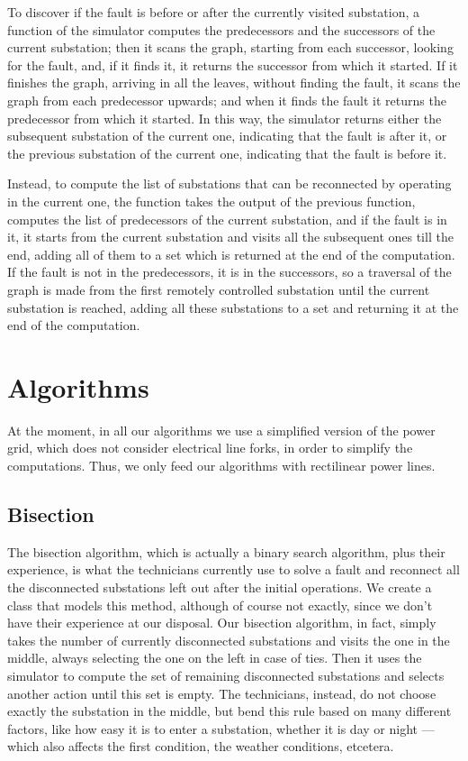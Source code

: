 To discover if the fault is before or after the currently visited substation, a function of the simulator computes the predecessors and the successors of the current substation; then it scans the graph, starting from each successor, looking for the fault, and, if it finds it, it returns the successor from which it started. If it finishes the graph, arriving in all the leaves, without finding the fault, it scans the graph from each predecessor upwards; and when it finds the fault it returns the predecessor from which it started. In this way, the simulator returns either the subsequent substation of the current one, indicating that the fault is after it, or the previous substation of the current one, indicating that the fault is before it.

Instead, to compute the list of substations that can be reconnected by operating in the current one, the function takes the output of the previous function, computes the list of predecessors of the current substation, and if the fault is in it, it starts from the current substation and visits all the subsequent ones till the end, adding all of them to a set which is returned at the end of the computation. If the fault is not in the predecessors, it is in the successors, so a traversal of the graph is made from the first remotely controlled substation until the current substation is reached, adding all these substations to a set and returning it at the end of the computation.


\section{Algorithms}


At the moment, in all our algorithms we use a simplified version of the power grid, which does not consider electrical line forks, in order to simplify the computations. Thus, we only feed our algorithms with rectilinear power lines.


\subsection{Bisection}

The bisection algorithm, which is actually a binary search algorithm, plus their experience, is what the technicians currently use to solve a fault and reconnect all the disconnected substations left out after the initial operations. We create a class that models this method, although of course not exactly, since we don't have their experience at our disposal. Our bisection algorithm, in fact, simply takes the number of currently disconnected substations and visits the one in the middle, always selecting the one on the left in case of ties. Then it uses the simulator to compute the set of remaining disconnected substations and selects another action until this set is empty. The technicians, instead, do not choose exactly the substation in the middle, but bend this rule based on many different factors, like how easy it is to enter a substation, whether it is day or night --- which also affects the first condition, the weather conditions, etcetera.

